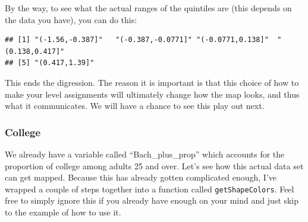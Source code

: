 \documentclass[openany]{book}
\newenvironment{Shaded}{\begin{snugshade}}{\end{snugshade}}
\newcommand{\DataTypeTok}[1]{\textcolor[rgb]{0.13,0.29,0.53}{#1}}
\newcommand{\DecValTok}[1]{\textcolor[rgb]{0.00,0.00,0.81}{#1}}
\newcommand{\KeywordTok}[1]{\textcolor[rgb]{0.13,0.29,0.53}{\textbf{#1}}}
\newcommand{\NormalTok}[1]{#1}
\newcommand{\OperatorTok}[1]{\textcolor[rgb]{0.81,0.36,0.00}{\textbf{#1}}}
\newcommand{\StringTok}[1]{\textcolor[rgb]{0.31,0.60,0.02}{#1}}
\begin{document}
By the way, to see what the actual ranges of the quintiles are (this depends on the data you have), you can do this:

\begin{Shaded}
\end{Shaded}

\begin{verbatim}
## [1] "(-1.56,-0.387]"   "(-0.387,-0.0771]" "(-0.0771,0.138]"  "(0.138,0.417]"   
## [5] "(0.417,1.39]"
\end{verbatim}

This ends the digression. The reason it is important is that this choice of how to make your level assignments will ultimately change how the map looks, and thus what it communicates. We will have a chance to see this play out next.

\hypertarget{college}{%
\subsubsection*{College}\label{college}}

We already have a variable called ``Bach\_plus\_prop'' which accounts for the proportion of college among adults 25 and over. Let's see how this actual data set can get mapped. Because this has already gotten complicated enough, I've wrapped a couple of steps together into a function called \texttt{getShapeColors}. Feel free to simply ignore this if you already have enough on your mind and just skip to the example of how to use it.
\end{document}
